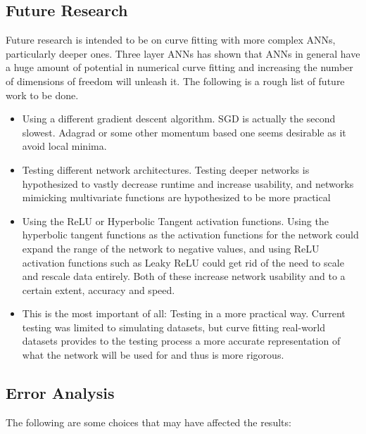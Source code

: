 \documentclass{article}
\begin{document}
\subsection{Future Research}

Future research is intended to be on curve fitting with more complex ANNs, particularly deeper ones. Three layer ANNs has shown that ANNs in general have a huge amount of potential in numerical curve fitting and increasing the number of dimensions of freedom will unleash it. The following is a rough list of future work to be done.

\begin{itemize}
    \item Using a different gradient descent algorithm. SGD is actually the second slowest. Adagrad or some other momentum based one seems desirable as it avoid local minima.
    \item Testing different network architectures. Testing deeper networks is hypothesized to vastly decrease runtime and increase usability, and networks mimicking multivariate functions are hypothesized to be more practical
    \item Using the ReLU or Hyperbolic Tangent activation functions. Using the hyperbolic tangent functions as the activation functions for the network could expand the range of the network to negative values, and using ReLU activation functions such as Leaky ReLU could get rid of the need to scale and rescale data entirely. Both of these increase network usability and to a certain extent, accuracy and speed.
    \item This is the most important of all: Testing in a more practical way. Current testing was limited to simulating datasets, but curve fitting real-world datasets provides to the testing process a more accurate representation of what the network will be used for and thus is more rigorous.
\end{itemize}

\subsection{Error Analysis}

The following are some choices that may have affected the results:
\end{document}
